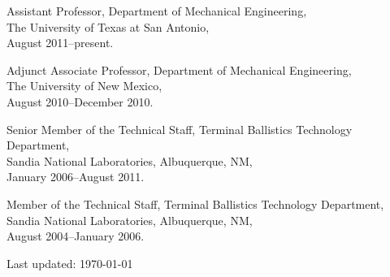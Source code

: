 \documentclass[12pt,letterpaper]{article}
\renewenvironment{itemize}{
  \begin{list}{}{
    \setlength{\leftmargin}{1.5em}
    \setlength{\itemsep}{0.25em}
    \setlength{\parskip}{0pt}
    \setlength{\parsep}{0.25em}
  }
}{
  \end{list}
}
\begin{document}
\begin{itemize}
\item Assistant Professor, Department of Mechanical Engineering, \\ The University of Texas at San Antonio,\\
  August 2011--present. 

\item Adjunct Associate Professor, Department of Mechanical Engineering, \\ The University of New Mexico, \\August 2010--December 2010.

\item Senior Member of the Technical Staff, Terminal Ballistics Technology Department, \\ Sandia National Laboratories, Albuquerque, NM, \\ January 2006--August 2011.

\item Member of the Technical Staff, Terminal Ballistics Technology Department, \\ Sandia National Laboratories, Albuquerque, NM, \\ August 2004--January 2006.
\end{itemize}







\vfill 
\begin{center}
  \begin{small}
    Last updated: \today
  \end{small}
\end{center}


\end{document}
